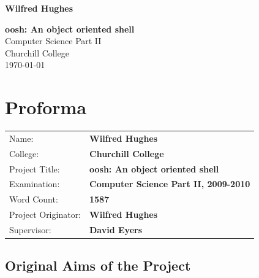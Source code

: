 \documentclass[12pt,twoside,notitlepage]{report}
\begin{document}





\pagestyle{empty}

\hfill{\LARGE \bf Wilfred Hughes}

\vspace*{60mm}
\begin{center}
\Huge
{\bf oosh: An object oriented shell} \\
\vspace*{5mm}
Computer Science Part II \\
\vspace*{5mm}
Churchill College \\
\vspace*{5mm}
\today  %
\end{center}

\cleardoublepage


\setcounter{page}{1}
\pagestyle{plain}

\chapter*{Proforma}

{\large
\begin{tabular}{ll}
Name:               & \bf Wilfred Hughes                       \\
College:            & \bf Churchill College                     \\
Project Title:      & \bf oosh: An object oriented shell \\
Examination:        & \bf Computer Science Part II, 2009-2010        \\
Word Count:         & \bf 1587 \\
Project Originator: & \bf Wilfred Hughes                    \\
Supervisor:         & \bf David Eyers                    \\ 
\end{tabular}
}

\section*{Original Aims of the Project}
\end{document}
